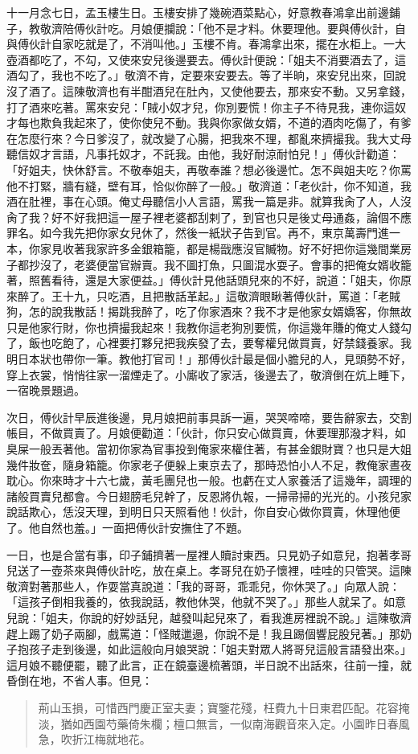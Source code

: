 十一月念七日，孟玉樓生日。玉樓安排了幾碗酒菜點心，好意教春鴻拿出前邊鋪子，教敬濟陪傅伙計吃。月娘便攔說：「他不是才料。休要理他。要與傅伙計，自與傅伙計自家吃就是了，不消叫他。」玉樓不肯。春鴻拿出來，擺在水柜上。一大壺酒都吃了，不勾，又使來安兒後邊要去。傅伙計便說：「姐夫不消要酒去了，這酒勾了，我也不吃了。」敬濟不肯，定要來安要去。等了半晌，來安兒出來，回說沒了酒了。這陳敬濟也有半酣酒兒在肚內，又使他要去，那來安不動。又另拿錢，打了酒來吃著。罵來安兒：「賊小奴才兒，你別要慌！你主子不待見我，連你這奴才每也欺負我起來了，使你使兒不動。我與你家做女婿，不道的酒肉吃傷了，有爹在怎麼行來？今日爹沒了，就改變了心腸，把我來不理，都亂來擠撮我。我大丈母聽信奴才言語，凡事托奴才，不託我。由他，我好耐涼耐怕兒！」傅伙計勸道：「好姐夫，快休舒言。不敬奉姐夫，再敬奉誰？想必後邊忙。怎不與姐夫吃？你罵他不打緊，牆有縫，壁有耳，恰似你醉了一般。」敬濟道：「老伙計，你不知道，我酒在肚裡，事在心頭。俺丈母聽信小人言語，罵我一篇是非。就算我肏了人，人沒肏了我？好不好我把這一屋子裡老婆都刮剌了，到官也只是後丈母通姦，論個不應罪名。如今我先把你家女兒休了，然後一紙狀子告到官。再不，東京萬壽門進一本，你家見收著我家許多金銀箱籠，都是楊戩應沒官贓物。好不好把你這幾間業房子都抄沒了，老婆便當官辦賣。我不圖打魚，只圖混水耍子。會事的把俺女婿收籠著，照舊看待，還是大家便益。」傅伙計見他話頭兒來的不好，說道：「姐夫，你原來醉了。王十九，只吃酒，且把散話革起。」這敬濟眼瞅著傅伙計，罵道：「老賊狗，怎的說我散話！揭跳我醉了，吃了你家酒來？我不才是他家女婿嬌客，你無故只是他家行財，你也擠撮我起來！我教你這老狗別要慌，你這幾年賺的俺丈人錢勾了，飯也吃飽了，心裡要打夥兒把我疾發了去，要奪權兒做買賣，好禁錢養家。我明日本狀也帶你一筆。教他打官司！」那傅伙計最是個小膽兒的人，見頭勢不好，穿上衣裳，悄悄往家一溜煙走了。小廝收了家活，後邊去了，敬濟倒在炕上睡下，一宿晚景題過。

次日，傅伙計早辰進後邊，見月娘把前事具訴一遍，哭哭啼啼，要告辭家去，交割帳目，不做買賣了。月娘便勸道：「伙計，你只安心做買賣，休要理那潑才料，如臭屎一般丟著他。當初你家為官事投到俺家來權住著，有甚金銀財寶？也只是大姐幾件妝奩，隨身箱籠。你家老子便躲上東京去了，那時恐怕小人不足，教俺家晝夜耽心。你來時才十六七歲，黃毛團兒也一般。也虧在丈人家養活了這幾年，調理的諸般買賣兒都會。今日翅膀毛兒幹了，反恩將仇報，一掃帚掃的光光的。小孩兒家說話欺心，恁沒天理，到明日只天照看他！伙計，你自安心做你買賣，休理他便了。他自然也羞。」一面把傅伙計安撫住了不題。

一日，也是合當有事，印子鋪擠著一屋裡人贖討東西。只見奶子如意兒，抱著孝哥兒送了一壺茶來與傅伙計吃，放在桌上。孝哥兒在奶子懷裡，哇哇的只管哭。這陳敬濟對著那些人，作耍當真說道：「我的哥哥，乖乖兒，你休哭了。」向眾人說：「這孩子倒相我養的，依我說話，教他休哭，他就不哭了。」那些人就呆了。如意兒說：「姐夫，你說的好妙話兒，越發叫起兒來了，看我進房裡說不說。」這陳敬濟趕上踢了奶子兩腳，戲罵道：「怪賊邋遢，你說不是！我且踢個響屁股兒著。」那奶子抱孩子走到後邊，如此這般向月娘哭說：「姐夫對眾人將哥兒這般言語發出來。」這月娘不聽便罷，聽了此言，正在鏡臺邊梳著頭，半日說不出話來，往前一撞，就昏倒在地，不省人事。但見：
\begin{quote}
荊山玉損，可惜西門慶正室夫妻；寶鑒花殘，枉費九十日東君匹配。花容掩淡，猶如西園芍藥倚朱欄；檀口無言，一似南海觀音來入定。小園昨日春風急，吹折江梅就地花。
\end{quote}

